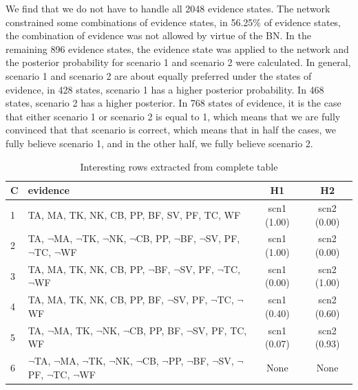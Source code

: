 \documentclass[12pt]{article}
\begin{document}
We find that we do not have to handle all 2048 evidence states. The network constrained some combinations of evidence states, in 56.25\% of evidence states, the combination of evidence was not allowed by virtue of the BN. In the remaining 896 evidence states, the evidence state was applied to the network and the posterior probability for scenario 1 and scenario 2 were calculated. In general, scenario 1 and scenario 2 are about equally preferred under the states of evidence, in 428 states, scenario 1 has a higher posterior probability. In 468 states, scenario 2 has a higher posterior. In 768 states of evidence, it is the case that either scenario 1 or scenario 2 is equal to 1, which means that we are fully convinced that that scenario is correct, which means that in half the cases, we fully believe scenario 1, and in the other half, we fully believe scenario 2.

\begin{table}[htbp]
\begin{center}
\begin{tabular}{|l|l|c|c|}
\hline
C & evidence & H1 & H2  \\
\hline
1 & TA, MA, TK, NK, CB, PP, BF, SV, PF, TC, WF & scn1 (1.00) & scn2 (0.00)\\
2 & TA, $\neg$MA, $\neg$TK, $\neg$NK, $\neg$CB, PP, $\neg$BF, $\neg$SV, PF, $\neg$TC, $\neg$WF & scn1 (1.00) & scn2 (0.00)\\
3 & TA, MA, TK, NK, CB, PP, $\neg$BF, $\neg$SV, PF, $\neg$TC, $\neg$WF & scn1 (0.00) & scn2 (1.00)\\
4 & TA, MA, TK, NK, CB, PP, BF, $\neg$SV, PF, $\neg$TC, $\neg$WF & scn1 (0.40) & scn2 (0.60)\\
5 & TA, $\neg$MA, TK, $\neg$NK, $\neg$CB, PP, BF, $\neg$SV, PF, TC, WF & scn1 (0.07) & scn2 (0.93)\\
6 & $\neg$TA, $\neg$MA, $\neg$TK, $\neg$NK, $\neg$CB, $\neg$PP, $\neg$BF, $\neg$SV, $\neg$PF, $\neg$TC, $\neg$WF & None & None\\

\hline
\end{tabular}
\end{center}
\caption{Interesting rows extracted from complete table}
\label{cases}
\end{table}
\end{document}
